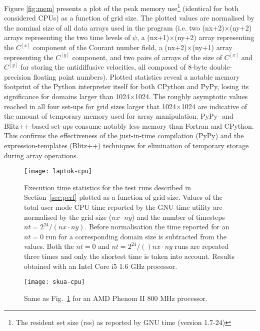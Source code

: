 \documentclass[final,5p,times,twocolumn]{elsarticle}
\begin{document}
  Figure \ref{fig:mem} presents a plot of the peak memory use\footnote{The resident set size (rss)
    as reported by GNU time (version 1.7-24)} (identical for both considered CPUs)
    as a function of grid size.
  The plotted values are normalised by the nominal size of all data arrays used in the program
    (i.e. two (nx+2)$\times$(ny+2) arrays representing the two time levels of $\psi$, 
     a (nx+1)$\times$(ny+2) array representing the $C^{[x]}$ component of the Courant number field,
     a (nx+2)$\times$(ny+1) array representing the $C^{[y]}$ component, 
     and two pairs of arrays of the size of $C^{[x]}$ and $C^{[y]}$ for storing the 
     antidiffusive velocities, all composed of 8-byte double-precision floating point numbers).
  Plotted statistics reveal a notable memory footprint of the Python interpreter itself
    for both CPython and PyPy, losing its significance for domains larger than 1024$\times$1024.
  The roughly asymptotic values reached in all four set-ups for grid sizes larger that 1024$\times$1024
    are indicative of the amount of temporary memory used for array manipulation.
  PyPy- and Blitz++-based set-ups consume notably less memory than Fortran and CPython.
  This confirms the effectiveness of the just-in-time compilation (PyPy) and the expression-templates (Blitz++) techniques
    for elimination of temporary storage during array operations.

  \begin{figure}[t]
    \center
    \texttt{[image: laptok-cpu]}
    \caption{\label{fig:cpu-eyrie}
      Execution time statistics for the test runs described in Section~\ref{sec:perf}
        plotted as a function of grid size.
      Values of the total user mode CPU time reported by the GNU time utility are
        normalised by the grid size ($nx \cdot ny$) and the number of timesteps $nt=2^{24}/(nx \cdot ny)$.
      Before normalisation the time reported for an $nt=0$ run for a corresponding
        domain size is subtracted from the values.
      Both the $nt=0$ and $nt=2^{24}/()nx \cdot ny$ runs are repeated three times and
        only the shortest time is taken into account.
      Results obtained with an Intel\textsuperscript{\textregistered} 
        Core\textsuperscript{\texttrademark} i5 1.6 GHz processor.
    }
  \end{figure}
  \begin{figure}[t]
    \center
    \texttt{[image: skua-cpu]}
    \caption{\label{fig:cpu-skua}
      Same as Fig.~\ref{fig:cpu-eyrie} for an AMD Phenom\textsuperscript{\texttrademark} II 800 MHz processor.
    }
  \end{figure}
\end{document}
